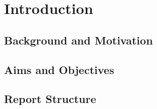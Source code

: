 \documentclass[../main.tex]{subfiles}
\begin{document}
\chapter{Introduction}
\label{ch:introduction}


\section{Background and Motivation}
\label{sec:intro-background}


\section{Aims and Objectives}
\label{sec:intro-aims}

\section{Report Structure}
\label{sec:intro-structure}
\end{document}
